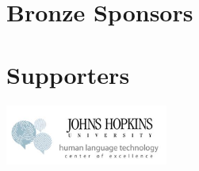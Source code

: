 \section*{Bronze Sponsors}
\begin{center}
\hspace{0.05\textwidth}
\end{center}

\section*{Supporters}
\begin{center}
\includegraphics[width=0.4\textwidth]{logos/hltcoe-side-balloons.png}
\end{center}

\clearpage

